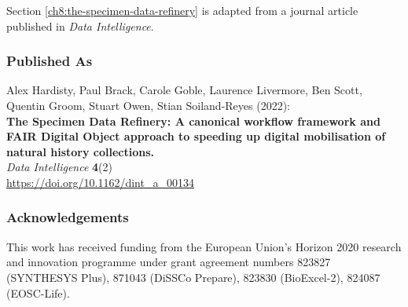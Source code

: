 Section \vref{ch8:the-specimen-data-refinery} is adapted from a journal article published in \emph{Data Intelligence}.

\subsubsection*{Published As}

Alex Hardisty, Paul Brack, Carole Goble, Laurence Livermore, Ben Scott,
Quentin Groom, Stuart Owen, Stian Soiland-Reyes (2022):\\
\textbf{The Specimen Data Refinery: A canonical workflow framework and
FAIR Digital Object approach to speeding up digital mobilisation of
natural history collections.}\\
\emph{Data Intelligence} \textbf{4}(2)\\
\url{https://doi.org/10.1162/dint_a_00134}


\subsubsection*{Acknowledgements}

This work has received funding from the European Union's Horizon 2020
research and innovation programme under grant agreement numbers 823827
(SYNTHESYS Plus), 871043 (DiSSCo Prepare), 823830 (BioExcel-2), 824087
(EOSC-Life).




